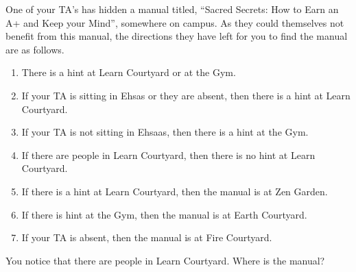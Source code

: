 \documentclass[addpoints]{exam}
\begin{document}
\begin{questions}

\question[5] One of your TA's has hidden a manual titled, ``Sacred Secrets: How to Earn an A+ and Keep your Mind'', somewhere on campus. As they could themselves not benefit from this manual, the directions they have left for you to find the manual are as follows.
  \begin{enumerate}
  \item There is a hint at Learn Courtyard or at the Gym.
  \item If your TA is sitting in Ehsas or they are absent, then there is a hint at Learn Courtyard.
  \item If your TA is not sitting in Ehsaas, then there is a hint at the Gym.
  \item If there are people in Learn Courtyard, then there is no hint at Learn Courtyard.
  \item If there is a hint at Learn Courtyard, then the manual is at Zen Garden.
  \item If there is hint at the Gym, then the manual is at Earth Courtyard.
  \item If your TA is absent, then the manual is at Fire Courtyard.
  \end{enumerate}
  You notice that there are people in Learn Courtyard. Where is the manual?


\end{questions}
\end{document}
